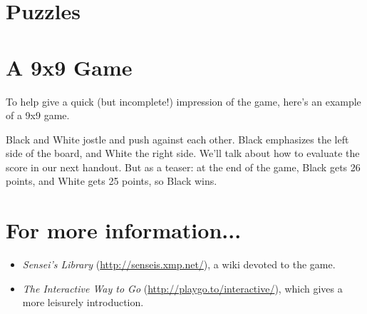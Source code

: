 \documentclass{article}
\begin{document}
\section*{Puzzles}
\begin{center}
\cleargoban
{}
\hspace{1in}%
\hspace{1in}%
\end{center}




\section*{A 9x9 Game}
To help give a quick (but incomplete!) impression of the game, here's
an example of a 9x9 game.
%
\begin{center}
\hspace{1in}%
\hspace{1in}%
\end{center}
%
Black and White jostle and push against each other.  Black emphasizes
the left side of the board, and White the right side.  We'll talk
about how to evaluate the score in our next handout.  But as a teaser:
at the end of the game, Black gets 26 points, and White gets 25
points, so Black wins.


\section*{For more information...}
\begin{itemize}

\item \emph{Sensei's Library} (\url{http://senseis.xmp.net/}), a wiki
  devoted to the game.

\item \emph{The Interactive Way to Go}
  (\url{http://playgo.to/interactive/}), which gives a more leisurely
  introduction.
\end{itemize}
\end{document}

